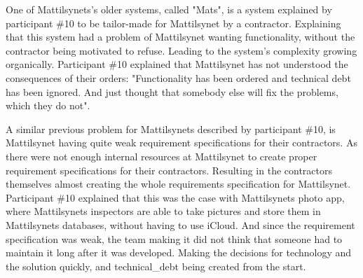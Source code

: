 

One of Mattilsynets's older systems, called "Mats", is a system explained by participant \#10 to be tailor-made for Mattilsynet by a contractor. Explaining that this system had a problem of Mattilsynet wanting functionality, without the contractor being motivated to refuse. Leading to the system's complexity growing organically. Participant \#10 explained that Mattilsynet has not understood the consequences of their orders: "Functionality has been ordered and technical debt has been ignored. And just thought that somebody else will fix the problems, which they do not".


A similar previous problem for Mattilsynets described by participant \#10, is Mattilsynet having quite weak requirement specifications for their contractors. As there were not enough internal resources at Mattilsynet to create proper requirement specifications for their contractors. Resulting in the contractors themselves almost creating the whole requirements specification for Mattilsynet. Participant \#10 explained that this was the case with Mattilsynets photo app, where Mattilsynets inspectors are able to take pictures and store them in Mattilsynets databases, without having to use iCloud. And since the requirement specification was weak, the team making it did not think that someone had to maintain it long after it was developed. Making the decisions for technology and the solution quickly, and \gls{technical_debt} being created from the start.

